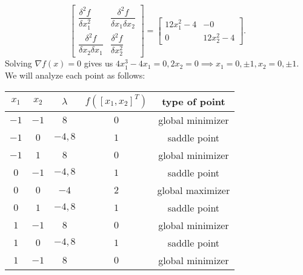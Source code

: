 \documentclass{article}
\begin{document}
\begin{enumerate}
\begin{enumerate}
\[\begin{bmatrix}
                            \dfrac{\delta^2 f}{\delta x_1^2} & \dfrac{\delta^2 f}{\delta x_1\delta x_2} \\\dfrac{\delta^2 f}{\delta x_2\delta x_1}&\dfrac{\delta^2 f}{\delta x_2^2}
                        \end{bmatrix}=\begin{bmatrix}
                            12x_1^2-4 & -0        \\
                            0         & 12x_2^2-4
                        \end{bmatrix}.
                    \] Solving $\nabla f(x)=0$ gives us $4x_1^3-4x_1=0,2x_2=0\implies x_1=0,\pm 1,x_2=0,\pm 1$. We will analyze each point as follows:
                    \begin{center}
                        \begin{tabular}{|c|c|c|c|c|}
                            \hline
                            $x_1$ & $x_2$ & $\lambda$ & $f([x_1,x_2]^T)$ & type of point    \\
                            \hline
                            $-1$  & $-1$  & $8$       & $0$              & global minimizer \\
                            \hline
                            $-1$  & $0$   & $-4,8$    & $1$              & saddle point     \\
                            \hline
                            $-1$  & $1$   & $8$       & $0$              & global minimizer \\
                            \hline
                            $0$   & $-1$  & $-4,8$    & $1$              & saddle point     \\
                            \hline
                            $0$   & $0$   & $-4$      & $2$              & global maximizer \\
                            \hline
                            $0$   & $1$   & $-4,8$    & $1$              & saddle point     \\
                            \hline
                            $1$   & $-1$  & $8$       & $0$              & global minimizer \\
                            \hline
                            $1$   & $0$   & $-4,8$    & $1$              & saddle point     \\
                            \hline
                            $1$   & $-1$  & $8$       & $0$              & global minimizer \\
                            \hline

\end{tabular}
\end{center}
\end{enumerate}
\end{enumerate}
\end{document}
